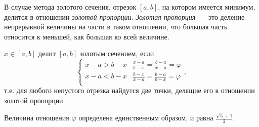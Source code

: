 \documentclass[10pt,a4paper,titlepage]{article}
\begin{document}
В случае метода золотого сечения, отрезок $[a,b]$, на котором имеется минимум, делится в отношении 
\textit{золотой пропорции}.
\textit{Золотая пропорция}~--- это деление непрерывной величины на части в таком отношении, 
что большая часть относится к меньшей, как большая ко всей величине.

$x \in [a,b]$ делит $[a,b]$ золотым сечением, если 
$$
\begin{cases}
  x - a > b - x &  \frac{x - a}{b - x} = \frac{b - a}{x - a} = \varphi \\
  x - a < b - x &  \frac{b - x}{x - a} = \frac{b - a}{b - x} = \varphi \\
\end{cases},
$$
т.е. для любого непустого отрезка найдутся две точки, делящие его в отношении золотой пропорции.

Величина отношения $\varphi$ определена единственным образом, и равна $\frac{\sqrt{5} + 1}{2}.$
\end{document}
